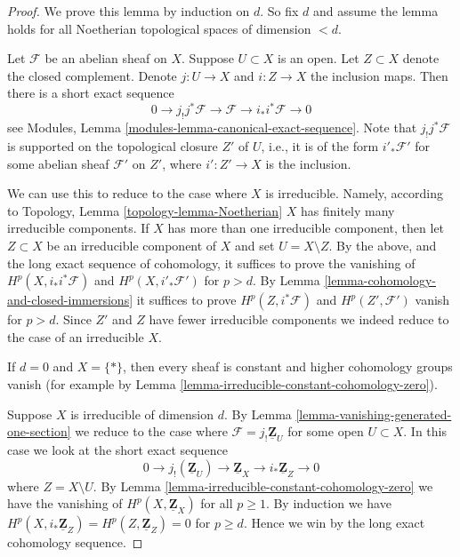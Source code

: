 \begin{proof}
We prove this lemma by induction on $d$.
So fix $d$ and assume the lemma holds for all
Noetherian topological spaces of dimension $< d$.

\medskip\noindent
Let $\mathcal{F}$ be an abelian sheaf on $X$.
Suppose $U \subset X$ is an open. Let $Z \subset X$
denote the closed complement.
Denote $j : U \to X$ and $i : Z \to X$ the inclusion maps.
Then there is a short exact sequence
$$
0 \to j_{!}j^*\mathcal{F} \to \mathcal{F} \to i_*i^*\mathcal{F} \to 0
$$
see Modules, Lemma \ref{modules-lemma-canonical-exact-sequence}.
Note that $j_!j^*\mathcal{F}$ is supported on
the topological closure $Z'$ of $U$, i.e., it is of
the form $i'_*\mathcal{F}'$ for some abelian sheaf $\mathcal{F}'$
on $Z'$, where $i' : Z' \to X$ is the inclusion.

\medskip\noindent
We can use this to reduce to the case where $X$ is irreducible.
Namely, according to
Topology, Lemma \ref{topology-lemma-Noetherian}
$X$ has finitely
many irreducible components. If $X$ has more than one irreducible
component, then let $Z \subset X$ be an irreducible component of $X$
and set $U = X \setminus Z$. By the above, and the long exact sequence
of cohomology, it suffices to prove the vanishing of
$H^p(X, i_*i^*\mathcal{F})$ and $H^p(X, i'_*\mathcal{F}')$ for $p > d$.
By Lemma \ref{lemma-cohomology-and-closed-immersions} it suffices to prove
$H^p(Z, i^*\mathcal{F})$ and $H^p(Z', \mathcal{F}')$ vanish for $p > d$.
Since $Z'$ and $Z$ have fewer irreducible components we indeed
reduce to the case of an irreducible $X$.

\medskip\noindent
If $d = 0$ and $X = \{*\}$, then every sheaf is constant and
higher cohomology
groups vanish (for example by
Lemma \ref{lemma-irreducible-constant-cohomology-zero}).

\medskip\noindent
Suppose $X$ is irreducible of dimension $d$.
By Lemma \ref{lemma-vanishing-generated-one-section}
we reduce to the case where
$\mathcal{F} = j_!\underline{\mathbf{Z}}_U$ for some open $U \subset X$.
In this case we look at the short exact sequence
$$
0 \to j_!(\underline{\mathbf{Z}}_U) \to
\underline{\mathbf{Z}}_X \to i_*\underline{\mathbf{Z}}_Z \to 0
$$
where $Z = X \setminus U$.
By Lemma \ref{lemma-irreducible-constant-cohomology-zero}
we have the vanishing of $H^p(X, \underline{\mathbf{Z}}_X)$
for all $p \geq 1$. By induction we have
$H^p(X, i_*\underline{\mathbf{Z}}_Z) = H^p(Z, \underline{\mathbf{Z}}_Z) = 0$
for $p \geq d$. Hence we win by the long exact cohomology sequence.
\end{proof}






